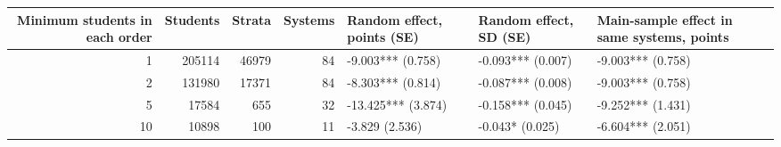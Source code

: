 \begin{tabular}{rrrrlll}
\toprule
Minimum students in each order & Students & Strata & Systems & Random effect, points (SE) & Random effect, SD (SE) & Main-sample effect in same systems, points \\
\midrule
1 & 205114 & 46979 & 84 & -9.003*** (0.758) & -0.093*** (0.007) & -9.003*** (0.758) \\
2 & 131980 & 17371 & 84 & -8.303*** (0.814) & -0.087*** (0.008) & -9.003*** (0.758) \\
5 & 17584 & 655 & 32 & -13.425*** (3.874) & -0.158*** (0.045) & -9.252*** (1.431) \\
10 & 10898 & 100 & 11 & -3.829 (2.536) & -0.043* (0.025) & -6.604*** (2.051) \\
\bottomrule
\end{tabular}

